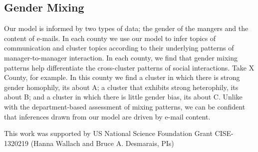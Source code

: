 \documentclass{pnastwo}
\begin{document}
\begin{article}
\section{Gender Mixing}

Our model is informed by two types of data; the gender of the mangers and the content of e-mails. In each county we use our model to infer topics of communication and cluster topics according to their underlying patterns of manager-to-manager interaction. In each county, we find that gender mixing patterns help differentiate the cross-cluster patterns of social interactions. Take X County, for example. In this county we find a cluster in which there is strong gender homophily, its about A; a cluster that exhibits strong heterophily, its about B; and a cluster in which there is little gender bias, its about C. Unlike with the department-based assessment of mixing patterns, we can be confident that inferences drawn from our model are driven by e-mail content.
	
	







\begin{acknowledgments}
This work was supported by US National Science Foundation Grant CISE-1320219 (Hanna Wallach and Bruce A. Desmarais, PIs)
\vspace{-.5cm}
\end{acknowledgments}




\end{article}
\end{document}

